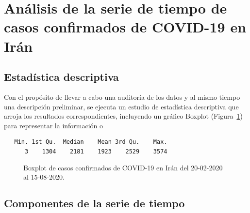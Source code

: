 \documentclass[
  us-letterpaper,
]{scrreprt}
\theoremstyle{plain}
\theoremstyle{definition}
\theoremstyle{definition}
\theoremstyle{plain}
\theoremstyle{remark}
\begin{document}
\section{Análisis de la serie de tiempo de casos confirmados de COVID-19
en
Irán}\label{anuxe1lisis-de-la-serie-de-tiempo-de-casos-confirmados-de-covid-19-en-iruxe1n}

\subsection{Estadística descriptiva}\label{estaduxedstica-descriptiva}

Con el propósito de llevar a cabo una auditoría de los datos y al mismo
tiempo una descripción preliminar, se ejecuta un estudio de estadística
descriptiva que arroja los resultados correspondientes, incluyendo un
gráfico Boxplot (Figura~\ref{fig-box}) para representar la información o

\begin{verbatim}
   Min. 1st Qu.  Median    Mean 3rd Qu.    Max. 
      3    1304    2181    1923    2529    3574 
\end{verbatim}

\begin{figure}


\caption{\label{fig-box}Boxplot de casos confirmados de COVID-19 en Irán
del 20-02-2020 al 15-08-2020.}

\end{figure}%

\subsection{Componentes de la serie de
tiempo}\label{componentes-de-la-serie-de-tiempo}
\end{document}
